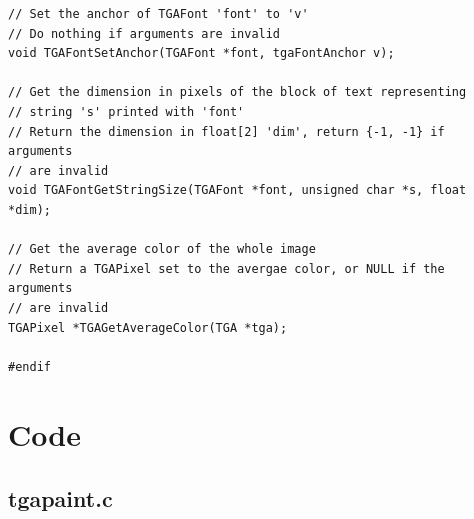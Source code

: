 \documentclass[12pt, a4paper]{article}
\begin{document}
\begin{scriptsize}
\begin{ttfamily}
\begin{lstlisting}
// Set the anchor of TGAFont 'font' to 'v'
// Do nothing if arguments are invalid
void TGAFontSetAnchor(TGAFont *font, tgaFontAnchor v);

// Get the dimension in pixels of the block of text representing 
// string 's' printed with 'font'
// Return the dimension in float[2] 'dim', return {-1, -1} if arguments
// are invalid
void TGAFontGetStringSize(TGAFont *font, unsigned char *s, float *dim);

// Get the average color of the whole image
// Return a TGAPixel set to the avergae color, or NULL if the arguments
// are invalid
TGAPixel *TGAGetAverageColor(TGA *tga);

#endif
\end{lstlisting}
\end{ttfamily}
\end{scriptsize}

\section{Code}

\subsection{tgapaint.c}
\end{document}
